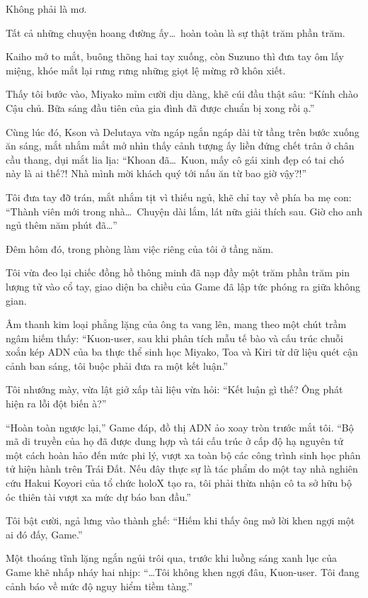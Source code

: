 \documentclass[../main.tex]{subfiles}
\begin{document}
Không phải là mơ.

Tất cả những chuyện hoang đường ấy\dots\ hoàn toàn là sự thật trăm phần trăm.

Kaiho mở to mắt, buông thõng hai tay xuống, còn Suzuno thì đưa tay ôm lấy miệng, khóe mắt lại rưng rưng những giọt lệ mừng rỡ khôn xiết.

Thấy tôi bước vào, Miyako mỉm cười dịu dàng, khẽ cúi đầu thật sâu: ``Kính chào Cậu chủ. Bữa sáng đầu tiên của gia đình đã được chuẩn bị xong rồi ạ.''

Cùng lúc đó, Kson và Delutaya vừa ngáp ngắn ngáp dài từ tầng trên bước xuống ăn sáng, mắt nhắm mắt mở nhìn thấy cảnh tượng ấy liền đứng chết trân ở chân cầu thang, dụi mắt lia lịa: ``Khoan đã\dots\ Kuon, mấy cô gái xinh đẹp có tai chó này là ai thế?! Nhà mình mời khách quý tới nấu ăn từ bao giờ vậy?!''

Tôi đưa tay đỡ trán, mắt nhắm tịt vì thiếu ngủ, khẽ chỉ tay về phía ba mẹ con: ``Thành viên mới trong nhà\dots\ Chuyện dài lắm, lát nữa giải thích sau. Giờ cho anh ngủ thêm năm phút đã\dots''

\ct

Đêm hôm đó, trong phòng làm việc riêng của tôi ở tầng năm.

Tôi vừa đeo lại chiếc đồng hồ thông minh đã nạp đầy một trăm phần trăm pin lượng tử vào cổ tay, giao diện ba chiều của Game đã lập tức phóng ra giữa không gian.

Âm thanh kim loại phẳng lặng của ông ta vang lên, mang theo một chút trầm ngâm hiếm thấy: ``Kuon-user, sau khi phân tích mẫu tế bào và cấu trúc chuỗi xoắn kép ADN của ba thực thể sinh học Miyako, Toa và Kiri từ dữ liệu quét cận cảnh ban sáng, tôi buộc phải đưa ra một kết luận.''

Tôi nhướng mày, vừa lật giở xấp tài liệu vừa hỏi: ``Kết luận gì thế? Ông phát hiện ra lỗi đột biến à?''

``Hoàn toàn ngược lại,'' Game đáp, đồ thị ADN ảo xoay tròn trước mắt tôi. ``Bộ mã di truyền của họ đã được dung hợp và tái cấu trúc ở cấp độ hạ nguyên tử một cách hoàn hảo đến mức phi lý, vượt xa toàn bộ các công trình sinh học phân tử hiện hành trên Trái Đất. Nếu đây thực sự là tác phẩm do một tay nhà nghiên cứu Hakui Koyori của tổ chức holoX tạo ra, tôi phải thừa nhận cô ta sở hữu bộ óc thiên tài vượt xa mức dự báo ban đầu.''

Tôi bật cười, ngả lưng vào thành ghế: ``Hiếm khi thấy ông mở lời khen ngợi một ai đó đấy, Game.''

Một thoáng tĩnh lặng ngắn ngủi trôi qua, trước khi luồng sáng xanh lục của Game khẽ nhấp nháy hai nhịp: ``\dots Tôi không khen ngợi đâu, Kuon-user. Tôi đang cảnh báo về mức độ nguy hiểm tiềm tàng.''
\end{document}
